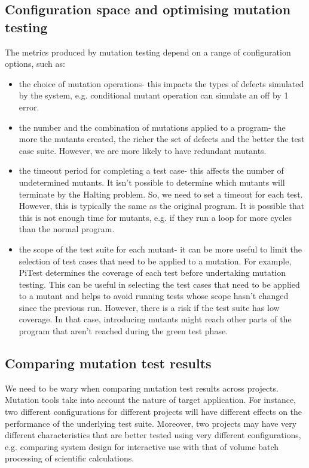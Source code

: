 \documentclass[a4paper, openany]{memoir}
\begin{document}
\subsection{Configuration space and optimising mutation testing}
The metrics produced by mutation testing depend on a range of configuration options, such as:
\begin{itemize}
    \item the choice of mutation operations- this impacts the types of defects simulated by the system, e.g. conditional mutant operation can simulate an off by 1 error.
    \item the number and the combination of mutations applied to a program- the more the mutants created, the richer the set of defects and the better the test case suite. However, we are more likely to have redundant mutants.
    \item the timeout period for completing a test case- this affects the number of undetermined mutants. It isn't possible to determine which mutants will terminate by the Halting problem. So, we need to set a timeout for each test. However, this is typically the same as the original program. It is possible that this is not enough time for mutants, e.g. if they run a loop for more cycles than the normal program.
    \item the scope of the test suite for each mutant- it can be more useful to limit the selection of test cases that need to be applied to a mutation. For example, PiTest determines the coverage of each test before undertaking mutation testing. This can be useful in selecting the test cases that need to be applied to a mutant and helps to avoid running tests whose scope hasn't changed since the previous run. However, there is a risk if the test suite has low coverage. In that case, introducing mutants might reach other parts of the program that aren't reached during the green test phase. 
\end{itemize}

\subsection{Comparing mutation test results}
We need to be wary when comparing mutation test results across projects. Mutation tools take into account the nature of target application. For instance, two different configurations for different projects will have different effects on the performance of the underlying test suite. Moreover, two projects may have very different characteristics that are better tested using very different configurations, e.g. comparing system design for interactive use with that of volume batch processing of scientific calculations.
\end{document}
